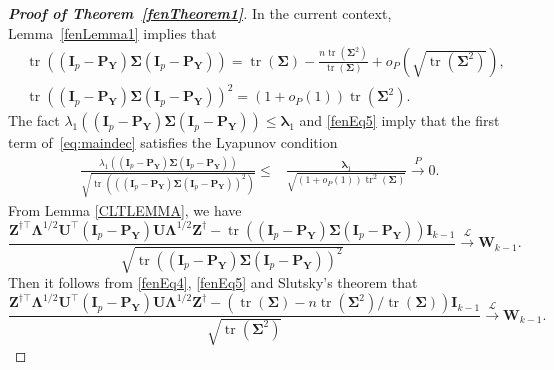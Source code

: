 \documentclass[12pt]{article} %
\DeclareMathOperator{\mytr}{tr}
\newcommand{\bZ}{\mathbf{Z}}
\newcommand{\bP}{\mathbf{P}}
\newcommand{\bY}{\mathbf{Y}}
\newcommand{\bI}{\mathbf{I}}
\newcommand{\bU}{\mathbf{U}}
\newcommand{\bW}{\mathbf{W}}
\newcommand{\bfsym}[1]{\ensuremath{\boldsymbol{#1}}}
\def\blambda {\bfsym {\lambda}}
\def\bLambda {\bfsym {\Lambda}}
\def\bSigma {\bfsym {\Sigma}}
\theoremstyle{definition}
\begin{document}
\begin{appendices}
\begin{proof}[\textbf{Proof of Theorem~\ref{fenTheorem1}}]
    In the current context, Lemma~\ref{fenLemma1} implies that
    \begin{align}
        &\mytr \left( (\bI_p-\bP_{\bY})\bSigma (\bI_p-\bP_{\bY})\right)=
        \mytr(\bSigma)-\frac{n\mytr(\bSigma^2)}{\mytr(\bSigma)}
        +o_P(\sqrt{\mytr(\bSigma^2)}),
        \label{fenEq4}
        \\
        &
        \mytr \left( (\bI_p-\bP_{\bY})\bSigma (\bI_p-\bP_{\bY})\right)^2
        =
        (1+o_P(1))
        \mytr(\bSigma^2)
        .
        \label{fenEq5}
    \end{align}
The fact $\lambda_1\left((\bI_p-\bP_\bY)\bSigma(\bI_p-\bP_\bY)\right)\leq \blambda_1$ and \eqref{fenEq5} imply that the first term of~\eqref{eq:maindec} satisfies the Lyapunov condition
\begin{equation*}
\begin{split}
\frac{\lambda_1\left((\bI_p-\bP_\bY)\bSigma(\bI_p-\bP_\bY)\right)}{\sqrt{\mytr\left(\left((\bI_p-\bP_\bY)\bSigma(\bI_p-\bP_\bY)\right)^2\right)}}
\leq &
\frac{
    \blambda_1
}{
    \sqrt{(1+o_P(1))\mytr^2(\bSigma)}
}
\xrightarrow{P} 0.
\end{split}
\end{equation*}
From Lemma \ref{CLTLEMMA}, we have
\begin{equation*}
    \frac{
    \bZ^{\dagger \top} \bLambda^{1/2}\bU^\top (\bI_p-\bP_{\bY})\bU\bLambda^{1/2}\bZ^{\dagger}
    -
        \mytr \left( (\bI_p-\bP_{\bY})\bSigma (\bI_p-\bP_{\bY})\right)
     \bI_{k-1}
 }{
     \sqrt{
        \mytr \left( (\bI_p-\bP_{\bY})\bSigma (\bI_p-\bP_{\bY})\right)^2
}
 }
\xrightarrow{\mathcal{L}} \bW_{k-1}.
\end{equation*}
Then it follows from \eqref{fenEq4}, \eqref{fenEq5} and Slutsky's theorem that
\begin{equation}
    \frac{
     \bZ^{\dagger\top} \bLambda^{1/2} \bU^\top (\bI_p-\bP_{\bY})\bU\bLambda^{1/2}\bZ^{\dagger}
 -\left(\mytr(\bSigma)-{n\mytr(\bSigma^2)}/{\mytr(\bSigma)}\right)\bI_{k-1} 
 }{
     \sqrt{\mytr(\bSigma^2)}
 }
\xrightarrow{\mathcal{L}} \bW_{k-1}.
    \label{bufenEq1}
\end{equation}


\end{proof}
\end{appendices}
\end{document}
